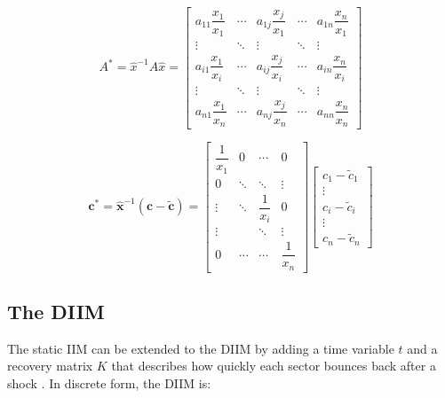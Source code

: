 \begin{equation}
    A^{*} = \hat{x}^{-1} A \hat{x} =
    \begin{bmatrix}
        a_{11}\dfrac{x_{1}}{x_{1}} & \cdots & a_{1j}\dfrac{x_{j}}{x_{1}} & \cdots & a_{1n}\dfrac{x_{n}}{x_{1}} \\
        \vdots & \ddots & \vdots & \ddots & \vdots \\
        a_{i1}\dfrac{x_{1}}{x_{i}} & \cdots & a_{ij}\dfrac{x_{j}}{x_{i}} & \cdots & a_{in}\dfrac{x_{n}}{x_{i}} \\
        \vdots & \ddots & \vdots & \ddots & \vdots \\
        a_{n1}\dfrac{x_{1}}{x_{n}} & \cdots & a_{nj}\dfrac{x_{j}}{x_{n}} & \cdots & a_{nn}\dfrac{x_{n}}{x_{n}}
    \end{bmatrix}
    \label{eq:astar-definition}
\end{equation}


\begin{equation}
    \label{eq:cstar-definition}
    \mathbf{c}^{*} = \hat{\mathbf{x}}^{-1} \left( \mathbf{c} - \tilde{\mathbf{c}} \right)
    =
    \begin{bmatrix}
        \dfrac{1}{x_{1}} & 0 & \cdots & 0 \\
        0 & \ddots & \ddots & \vdots \\
        \vdots & \ddots & \dfrac{1}{x_{i}} & 0 \\
        \vdots & & \ddots & \vdots \\
        0 & \cdots & \cdots & \dfrac{1}{x_{n}}
    \end{bmatrix}
    \begin{bmatrix}
        c_{1} - \tilde{c}_{1} \\
        \vdots \\
        c_{i} - \tilde{c}_{i} \\
        \vdots \\
        c_{n} - \tilde{c}_{n}
    \end{bmatrix}
\end{equation}

\subsection{The DIIM}

The static IIM can be extended to the DIIM by adding a time variable $t$ and a recovery matrix $K$ that describes how quickly each sector bounces back after a shock \cite{SantosHaimes2004}. In discrete form, the DIIM is:

